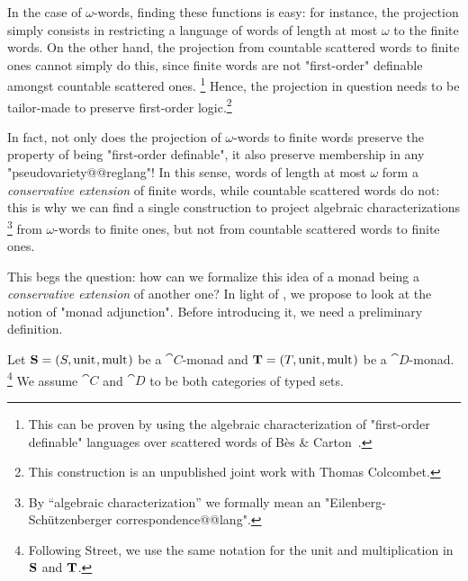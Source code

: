In the case of $\omega$-words, finding these functions is easy: for instance, 
the projection simply consists in restricting a language of words of
length at most $\omega$ to the finite words.
On the other hand, the projection from countable scattered words
to finite ones cannot simply do this, since finite words are not
"first-order" definable amongst countable scattered ones.%
\footnote{This can be proven by using the algebraic characterization
of "first-order definable" languages over scattered words of
Bès \& Carton~\cite[Theorem~21]{BesCarton2011AlgebraicFO}.}
Hence, the projection in question needs to be tailor-made to 
preserve first-order logic.\footnote{This construction is an unpublished joint
work with Thomas Colcombet.}

In fact, not only does the projection of $\omega$-words to finite words preserve
the property of being "first-order definable", it also preserve membership in any
"pseudovariety@@reglang"! In this sense, words of length at most $\omega$
form a \emph{conservative extension} of finite words, while
countable scattered words do not: this is why we can find a single construction
to project algebraic characterizations%
\footnote{By ``algebraic characterization'' we formally mean an "Eilenberg-Schützenberger correspondence@@lang".}
from $\omega$-words to finite ones, but not from countable scattered words to finite ones.

This begs the question: how can we formalize this idea of a monad being
a \emph{conservative extension} of another one?
In light of , we propose to look at the notion of "monad adjunction".
Before introducing it, we need a preliminary definition.

Let $\Monad[S] = (S,\unit,\mult)$ be a $\cat{C}$-monad
and $\Monad[T] = (T,\unit,\mult)$ be a $\cat{D}$-monad.%
\footnote{Following Street, we use the same notation for the unit and multiplication in $\Monad[S]$ and $\Monad[T]$.}
We assume $\cat C$ and $\cat D$ to be both categories of typed sets.

